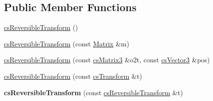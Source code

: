 \subsection*{Public Member Functions}
\begin{DoxyCompactItemize}
\item 
\hyperlink{classcsReversibleTransform_a141d3b365df0f36b1fb1b704d2e8dc91}{cs\+Reversible\+Transform} ()
\item 
\hyperlink{classcsReversibleTransform_a917f54955d333318b6c5214aab098d42}{cs\+Reversible\+Transform} (const \hyperlink{classMatrix}{Matrix} \&m)
\item 
\hyperlink{classcsReversibleTransform_af0d26f0b33e7692b5fc018b1e9a7f8c1}{cs\+Reversible\+Transform} (const \hyperlink{classcsMatrix3}{cs\+Matrix3} \&o2t, const \hyperlink{classcsVector3}{cs\+Vector3} \&pos)
\item 
\hyperlink{classcsReversibleTransform_a2430185a991ce4493378b2e657828499}{cs\+Reversible\+Transform} (const \hyperlink{classcsTransform}{cs\+Transform} \&t)
\item 
{\bfseries cs\+Reversible\+Transform} (const \hyperlink{classcsReversibleTransform}{cs\+Reversible\+Transform} \&t)\hypertarget{classcsReversibleTransform_a262626bbd8bc304f09ab008e67ff7e54}{}\label{classcsReversibleTransform_a262626bbd8bc304f09ab008e67ff7e54}


\end{DoxyCompactItemize}
